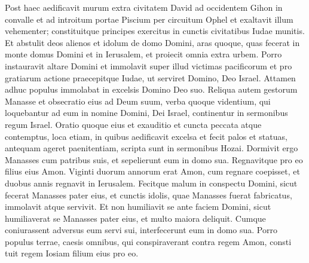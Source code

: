 \begin{biblechapter}
\begin{biblechapter}
\begin{biblechapter}
\begin{biblechapter}
\begin{biblechapter}
\begin{biblechapter}
\begin{biblechapter}
\begin{biblechapter}
\begin{biblechapter}
\begin{biblechapter}
\begin{biblechapter}
\begin{biblechapter}
\begin{biblechapter}
\begin{biblechapter}
\begin{biblechapter}
\begin{biblechapter}
\begin{biblechapter}
\begin{biblechapter}
\begin{biblechapter}
\begin{biblechapter}
\begin{biblechapter}
\begin{biblechapter}
\begin{biblechapter}
\begin{biblechapter}
\begin{biblechapter}
\begin{biblechapter}
\begin{biblechapter}
\begin{biblechapter}
\begin{biblechapter}
\begin{biblechapter}
\begin{biblechapter}
\begin{biblechapter}
\begin{biblechapter}
 \verse Post haec aedificavit murum extra civitatem David ad occidentem Gihon in convalle et ad introitum portae Piscium per circuitum Ophel et exaltavit illum vehementer; constituitque principes exercitus in cunctis civitatibus Iudae munitis. 
\verse Et abstulit deos alienos et idolum de domo Domini, aras quoque, quas fecerat in monte domus Domini et in Ierusalem, et proiecit omnia extra urbem. 
\verse Porro instauravit altare Domini et immolavit super illud victimas pacificorum et pro gratiarum actione praecepitque Iudae, ut serviret Domino, Deo Israel. 
\verse Attamen adhuc populus immolabat in excelsis Domino Deo suo.
 \verse Reliqua autem gestorum Manasse et obsecratio eius ad Deum suum, verba quoque videntium, qui loquebantur ad eum in nomine Domini, Dei Israel, continentur in sermonibus regum Israel. 
\verse Oratio quoque eius et exauditio et cuncta peccata atque contemptus, loca etiam, in quibus aedificavit excelsa et fecit palos et statuas, antequam ageret paenitentiam, scripta sunt in sermonibus Hozai. 
\verse Dormivit ergo Manasses cum patribus suis, et sepelierunt eum in domo sua. Regnavitque pro eo filius eius Amon.
 \verse Viginti duorum annorum erat Amon, cum regnare coepisset, et duobus annis regnavit in Ierusalem. 
\verse Fecitque malum in conspectu Domini, sicut fecerat Manasses pater eius, et cunctis idolis, quae Manasses fuerat fabricatus, immolavit atque servivit. 
\verse Et non humiliavit se ante faciem Domini, sicut humiliaverat se Manasses pater eius, et multo maiora deliquit. 
\verse Cumque coniurassent adversus eum servi sui, interfecerunt eum in domo sua. 
\verse Porro populus terrae, caesis omnibus, qui conspiraverant contra regem Amon, consti tuit regem Iosiam filium eius pro eo.
 

\end{biblechapter}
\end{biblechapter}
\end{biblechapter}
\end{biblechapter}
\end{biblechapter}
\end{biblechapter}
\end{biblechapter}
\end{biblechapter}
\end{biblechapter}
\end{biblechapter}
\end{biblechapter}
\end{biblechapter}
\end{biblechapter}
\end{biblechapter}
\end{biblechapter}
\end{biblechapter}
\end{biblechapter}
\end{biblechapter}
\end{biblechapter}
\end{biblechapter}
\end{biblechapter}
\end{biblechapter}
\end{biblechapter}
\end{biblechapter}
\end{biblechapter}
\end{biblechapter}
\end{biblechapter}
\end{biblechapter}
\end{biblechapter}
\end{biblechapter}
\end{biblechapter}
\end{biblechapter}
\end{biblechapter}
